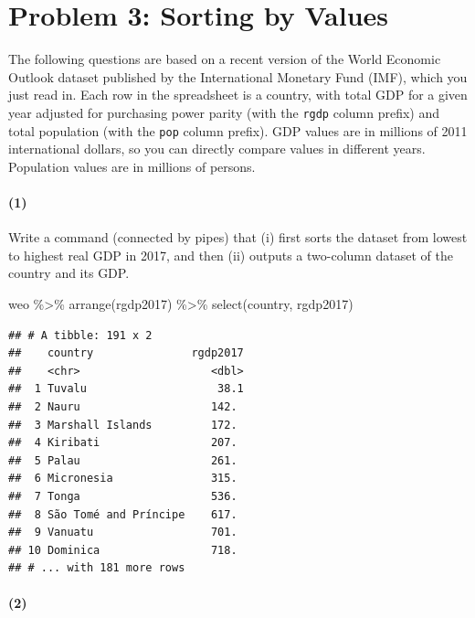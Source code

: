 \documentclass[11pt]{article}
\newenvironment{Shaded}{\begin{snugshade}}{\end{snugshade}}
\newcommand{\FunctionTok}[1]{\textcolor[rgb]{0.00,0.00,0.00}{#1}}
\newcommand{\NormalTok}[1]{#1}
\newcommand{\SpecialCharTok}[1]{\textcolor[rgb]{0.00,0.00,0.00}{#1}}
\begin{document}
\newpage

\hypertarget{problem-3-sorting-by-values}{%
\section*{Problem 3: Sorting by
Values}\label{problem-3-sorting-by-values}}

The following questions are based on a recent version of the World
Economic Outlook dataset published by the International Monetary Fund
(IMF), which you just read in. Each row in the spreadsheet is a country,
with total GDP for a given year adjusted for purchasing power parity
(with the \texttt{rgdp} column prefix) and total population (with the
\texttt{pop} column prefix). GDP values are in millions of 2011
international dollars, so you can directly compare values in different
years. Population values are in millions of persons.

\paragraph{(1)}

Write a command (connected by pipes) that (i) first sorts the dataset
from lowest to highest real GDP in 2017, and then (ii) outputs a
two-column dataset of the country and its GDP.

\begin{Shaded}
\begin{Highlighting}[]
\NormalTok{weo }\SpecialCharTok{\%\textgreater{}\%}
  \FunctionTok{arrange}\NormalTok{(rgdp2017) }\SpecialCharTok{\%\textgreater{}\%}
  \FunctionTok{select}\NormalTok{(country, rgdp2017)}
\end{Highlighting}
\end{Shaded}

\begin{verbatim}
## # A tibble: 191 x 2
##    country               rgdp2017
##    <chr>                    <dbl>
##  1 Tuvalu                    38.1
##  2 Nauru                    142. 
##  3 Marshall Islands         172. 
##  4 Kiribati                 207. 
##  5 Palau                    261. 
##  6 Micronesia               315. 
##  7 Tonga                    536. 
##  8 São Tomé and Príncipe    617. 
##  9 Vanuatu                  701. 
## 10 Dominica                 718. 
## # ... with 181 more rows
\end{verbatim}

\paragraph{(2)}
\end{document}
